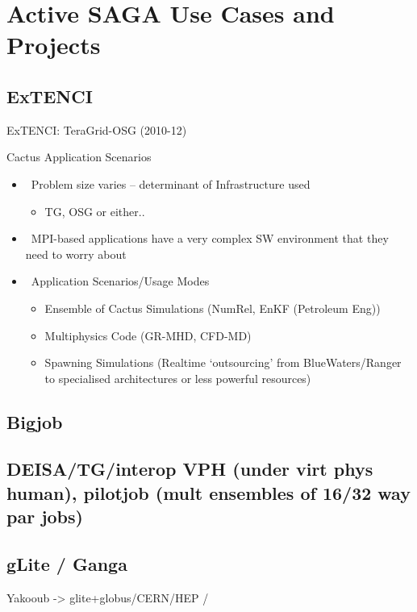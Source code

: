 \documentclass[3p,twocolumn]{article}
\begin{document}
\section{Active SAGA Use Cases and Projects}

 \subsection{ExTENCI}

 ExTENCI: TeraGrid-OSG (2010-12)

 Cactus Application Scenarios
 
 \begin{itemize}
  \item  Problem size varies – determinant of Infrastructure used
   \begin{itemize}
    \item TG, OSG or either..
   \end{itemize}
  \item  MPI-based applications have a very complex SW
         environment that they need to worry about
  \item  Application Scenarios/Usage Modes
   \begin{itemize}
    \item Ensemble of Cactus Simulations
          (NumRel, EnKF (Petroleum Eng))
    \item Multiphysics Code
          (GR-MHD, CFD-MD)
    \item Spawning Simulations
          (Realtime ‘outsourcing’ from BlueWaters/Ranger to 
           specialised architectures or less powerful resources)
   \end{itemize}
  \end{itemize}

 \subsection{Bigjob}

 \subsection{DEISA/TG/interop VPH (under virt phys human), pilotjob
 (mult ensembles of 16/32 way par jobs)}

 \subsection{gLite / Ganga}

  Yakooub -> glite+globus/CERN/HEP /
\end{document}
